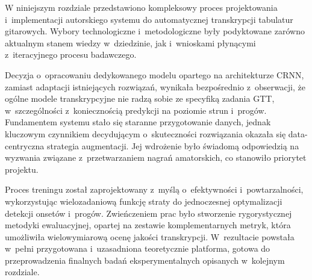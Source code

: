 W niniejszym rozdziale przedstawiono kompleksowy proces projektowania i~implementacji autorskiego systemu do automatycznej transkrypcji tabulatur gitarowych. Wybory technologiczne i~metodologiczne były podyktowane zarówno aktualnym stanem wiedzy w~dziedzinie, jak i~wnioskami płynącymi z~iteracyjnego procesu badawczego.

Decyzja o~opracowaniu dedykowanego modelu opartego na architekturze CRNN, zamiast adaptacji istniejących rozwiązań, wynikała bezpośrednio z~obserwacji, że ogólne modele transkrypcyjne nie radzą sobie ze specyfiką zadania GTT, w~szczególności z~koniecznością predykcji na poziomie strun i~progów. Fundamentem systemu stało się staranne przygotowanie danych, jednak kluczowym czynnikiem decydującym o~skuteczności rozwiązania okazała się data-centryczna strategia augmentacji. Jej wdrożenie było świadomą odpowiedzią na wyzwania związane z~przetwarzaniem nagrań amatorskich, co stanowiło priorytet projektu.

Proces treningu został zaprojektowany z~myślą o~efektywności i~powtarzalności, wykorzystując wielozadaniową funkcję straty do jednoczesnej optymalizacji detekcji onsetów i~progów. Zwieńczeniem prac było stworzenie rygorystycznej metodyki ewaluacyjnej, opartej na zestawie komplementarnych metryk, która umożliwiła wielowymiarową ocenę jakości transkrypcji. W~rezultacie powstała w~pełni przygotowana i~uzasadniona teoretycznie platforma, gotowa do przeprowadzenia finalnych badań eksperymentalnych opisanych w~kolejnym rozdziale.